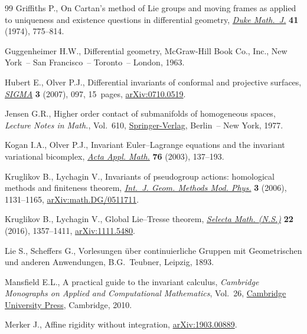 \documentclass[pdftex]{sigma}%
\numberwithin{equation}{section}
\begin{document}
\begin{thebibliography}{99}
Griffiths P., On {C}artan's method of {L}ie groups and moving frames as applied
 to uniqueness and existence questions in differential geometry, \href{https://doi.org/10.1215/S0012-7094-74-04180-5}{\textit{Duke
 Math.~J.}} \textbf{41} (1974), 775--814.

Guggenheimer H.W., Differential geometry, McGraw-Hill Book Co., Inc., New
 York~-- San Francisco~-- Toronto~-- London, 1963.

Hubert E., Olver P.J., Differential invariants of conformal and projective
 surfaces, \href{https://doi.org/10.3842/SIGMA.2007.097}{\textit{SIGMA}} \textbf{3} (2007), 097, 15~pages,
 \href{https://arxiv.org/abs/0710.0519}{arXiv:0710.0519}.

Jensen G.R., Higher order contact of submanifolds of homogeneous spaces,
 \textit{Lecture Notes in Math.}, Vol.~610, \href{https://doi.org/10.1007/BFb0068415}{Springer-Verlag}, Berlin~-- New
 York, 1977.

Kogan I.A., Olver P.J., Invariant {E}uler--{L}agrange equations and the
 invariant variational bicomplex, \href{https://doi.org/10.1023/A:1022993616247}{\textit{Acta Appl. Math.}} \textbf{76}
 (2003), 137--193.

Kruglikov B., Lychagin V., Invariants of pseudogroup actions: homological
 methods and finiteness theorem, \href{https://doi.org/10.1142/S0219887806001478}{\textit{Int.~J. Geom. Methods Mod. Phys.}}
 \textbf{3} (2006), 1131--1165, \href{https://arxiv.org/abs/math.DG/0511711}{arXiv:math.DG/0511711}.

Kruglikov B., Lychagin V., Global {L}ie--{T}resse theorem, \href{https://doi.org/10.1007/s00029-015-0220-z}{\textit{Selecta
 Math. (N.S.)}} \textbf{22} (2016), 1357--1411, \href{https://arxiv.org/abs/1111.5480}{arXiv:1111.5480}.

Lie S., Scheffers G., Vorlesungen \"uber continuierliche {G}ruppen mit
 {G}eometrischen und anderen {A}nwendungen, B.G.~Teubner, Leipzig, 1893.

Mansfield E.L., A practical guide to the invariant calculus, \textit{Cambridge
 Monographs on Applied and Computational Mathematics}, Vol.~26, \href{https://doi.org/10.1017/CBO9780511844621}{Cambridge
 University Press}, Cambridge, 2010.

Merker J., Affine rigidity without integration, \href{https://arxiv.org/abs/1903.00889}{arXiv:1903.00889}.


\end{thebibliography}
\end{document}
